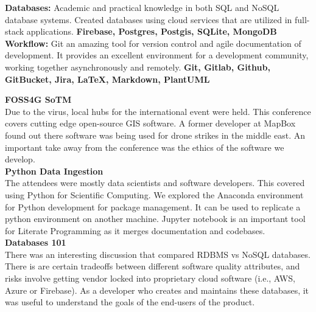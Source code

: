 \documentclass[9pt]{developercv}
\begin{document}
\textbf{Databases:} Academic and practical knowledge in both SQL and NoSQL database systems. Created databases using cloud services that are utilized in full-stack applications. \textbf{Firebase, Postgres, Postgis, SQLite, MongoDB} \\

\textbf{Workflow:} Git an amazing tool for version control and agile documentation of development. It provides an excellent environment for a development community, working together asynchronously and remotely. \textbf{Git, Gitlab, Github, GitBucket, Jira, LaTeX, Markdown, PlantUML}



\textbf{FOSS4G SoTM} \\
Due to the virus, local hubs for the international event were held. This conference covers cutting edge open-source GIS software. A former developer at MapBox found out there software was being used for drone strikes in the middle east. An important take away from the conference was the ethics of the software we develop. \\

\textbf{Python Data Ingestion} \\
The attendees were mostly data scientists and software developers. This covered using Python for Scientific Computing. We explored the Anaconda environment for Python development for package management. It can be used to replicate a python environment on another machine. Jupyter notebook is an important tool for Literate Programming as it merges documentation and codebases. \\

\textbf{Databases 101} \\
There was an interesting discussion that compared RDBMS vs NoSQL databases. There is are certain tradeoffs between different software quality attributes, and risks involve getting vendor locked into proprietary cloud software (i.e., AWS, Azure or Firebase). As a developer who creates and maintains these databases, it was useful to understand the goals of the end-users of the product.

\end{document}
